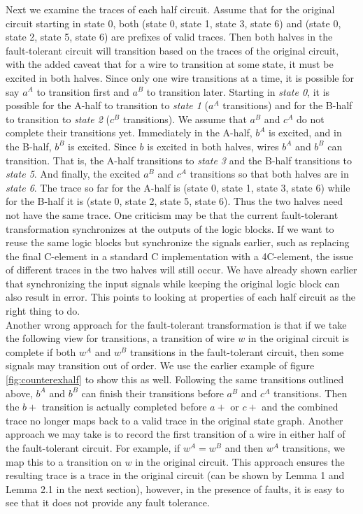 \documentclass[12pt]{report}
\begin{document}
Next we examine the traces of each half circuit.  Assume that for the original circuit starting in state 0, both (state 0, state 1, state 3, state 6) and (state 0, state 2, state 5, state 6) are prefixes of valid traces.  Then both halves in the fault-tolerant circuit will transition based on the traces of the original circuit, with the added caveat that for a wire to transition at some state, it must be excited in both halves.  Since only one wire transitions at a time, it is possible for say $a^A$ to transition first and $a^B$ to transition later.  Starting in {\em state 0}, it is possible for the A-half to transition to {\em state 1} ($a^A$ transitions) and for the B-half to transition to {\em state 2} ($c^B$ transitions).  We assume that $a^B$ and $c^A$ do not complete their transitions yet.  Immediately in the A-half, $b^A$ is excited, and in the B-half, $b^B$ is excited.  Since $b$ is excited in both halves, wires $b^A$ and $b^B$ can transition.  That is, the A-half transitions to {\em state 3} and the B-half transitions to {\em state 5}.  And finally, the excited $a^B$ and $c^A$ transitions so that both halves are in {\em state 6}.  The trace so far for the A-half is (state 0, state 1, state 3, state 6) while for the B-half it is (state 0, state 2, state 5, state 6).  Thus the two halves need not have the same trace.  One criticism may be that the current fault-tolerant transformation synchronizes at the outputs of the logic blocks.  If we want to reuse the same logic blocks but synchronize the signals earlier, such as replacing the final C-element in a standard C implementation with a 4C-element, the issue of different traces in the two halves will still occur.  We have already shown earlier that synchronizing the input signals while keeping the original logic block can also result in error.  This points to looking at properties of each half circuit as the right thing to do.\\ 

Another wrong approach for the fault-tolerant transformation is that if we take the following view for transitions, a transition of wire $w$ in the original circuit is complete if both $w^A$ and $w^B$ transitions in the fault-tolerant circuit, then some signals may transition out of order.  We use the earlier example of figure \ref{fig:counterexhalf} to show this as well.  Following the same transitions outlined above, $b^A$ and $b^B$ can finish their transitions before $a^B$ and $c^A$ transitions.  Then the $b+$ transition is actually completed before $a+$ or $c+$ and the combined trace no longer maps back to a valid trace in the original state graph.  Another approach we may take is to record the first transition of a wire in either half of the fault-tolerant circuit.  For example, if $w^A=w^B$ and then $w^A$ transitions, we map this to a transition on $w$ in the original circuit.  This approach ensures the resulting trace is a trace in the original circuit (can be shown by Lemma 1 and Lemma 2.1 in the next section), however, in the presence of faults, it is easy to see that it does not provide any fault tolerance.\\
\end{document}

